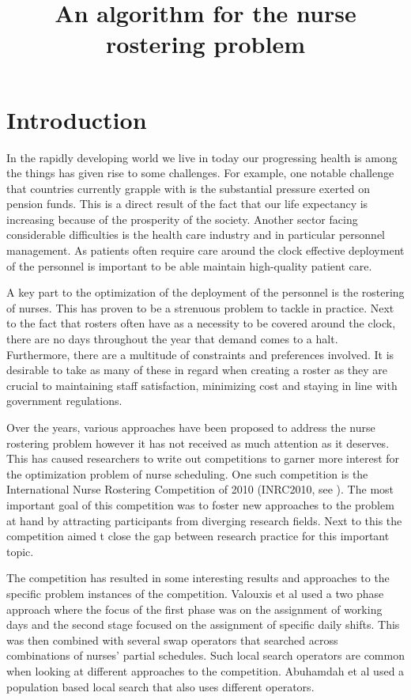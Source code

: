 \documentclass{article}
\title{An algorithm for the nurse rostering problem}
\begin{document}
\maketitle

\section{Introduction}

In the rapidly developing world we live in today our progressing health is among the things has given rise to some challenges.
For example, one notable challenge that countries currently grapple with is the substantial pressure exerted on pension funds.
This is a direct result of the fact that our life expectancy is increasing because of the prosperity of the society.
Another sector facing considerable difficulties is the health care industry and in particular personnel management.
As patients often require care around the clock effective deployment of the personnel is important to be able maintain high-quality patient care.

A key part to the optimization of the deployment of the personnel is the rostering of nurses.
This has proven to be a strenuous problem to tackle in practice.
Next to the fact that rosters often have as a necessity to be covered around the clock, there are no days throughout the year that demand comes to a halt.
Furthermore, there are a multitude of constraints and preferences involved.
It is desirable to take as many of these in regard when creating a roster as they are crucial to maintaining staff satisfaction, minimizing cost and staying in line with government regulations.

Over the years, various approaches have been proposed to address the nurse rostering problem however it has not received as much attention as it deserves.
This has caused researchers to write out competitions to garner more interest for the optimization problem of nurse scheduling.
One such competition is the International Nurse Rostering Competition of 2010 (INRC2010, see \cite{inrc}).
The most important goal of this competition was to foster new approaches to the problem at hand by attracting participants from diverging research fields.
Next to this the competition aimed t close the gap between research practice for this important topic.

The competition has resulted in some interesting results and approaches to the specific problem instances of the competition.
Valouxis et al used a two phase approach where the focus of the first phase was on the assignment of working days and the second stage focused on the assignment of specific daily shifts\cite{Valouxis}.
This was then combined with several swap operators that searched across combinations of nurses' partial schedules.
Such local search operators are common when looking at different approaches to the competition.
Abuhamdah et al used a population based local search that also uses different operators\cite{Abuhamdah}.
\end{document}
